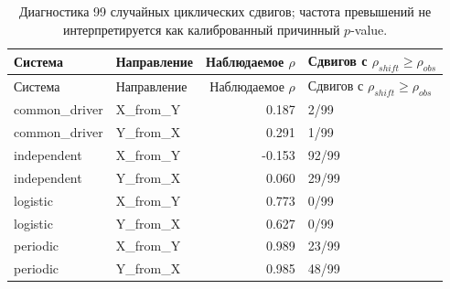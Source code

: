 \begin{longtable}{llrl}
\caption{Диагностика 99 случайных циклических сдвигов; частота превышений не интерпретируется как калиброванный причинный $p$-value.}\label{tab:surrogates}\\
\toprule
Система & Направление & Наблюдаемое $\rho$ & Сдвигов с $\rho_{shift}\geq\rho_{obs}$ \\
\midrule
\endfirsthead
\toprule
Система & Направление & Наблюдаемое $\rho$ & Сдвигов с $\rho_{shift}\geq\rho_{obs}$ \\
\midrule
\endhead
common\_driver & X\_from\_Y & 0.187 & 2/99 \\
common\_driver & Y\_from\_X & 0.291 & 1/99 \\
independent & X\_from\_Y & -0.153 & 92/99 \\
independent & Y\_from\_X & 0.060 & 29/99 \\
logistic & X\_from\_Y & 0.773 & 0/99 \\
logistic & Y\_from\_X & 0.627 & 0/99 \\
periodic & X\_from\_Y & 0.989 & 23/99 \\
periodic & Y\_from\_X & 0.985 & 48/99 \\
\bottomrule
\end{longtable}
